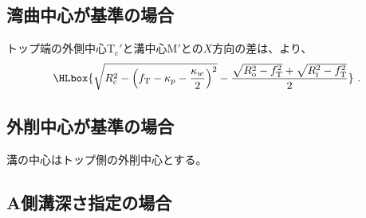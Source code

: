 \subsection{湾曲中心が基準の場合}
トップ端の外側中心T$_\mathrm c'$と溝中心M$'$との$X$方向の差は、より、
\begin{align*}
  \HLbox{%
    \sqrt{R_\mathrm c^2-\left(f_\mathrm T-\kappa_p-\frac{\kappa_w}2\right)^2}
    -\frac{\sqrt{R_\mathrm o^2-f_\mathrm T^2}+\sqrt{R_\mathrm i^2-f_\mathrm T^2}}2%
  }\ .
\end{align*}


\subsection{外削中心が基準の場合}
溝の中心はトップ側の外削中心とする。


\subsection{A側溝深さ指定の場合}

